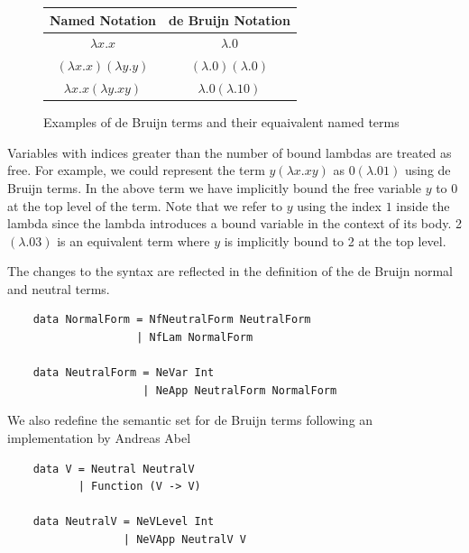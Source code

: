 \begin{figure}[h]
    \centering
    \begin{tabular}{ |c|c| } 
        \hline
        Named Notation & de Bruijn Notation \\
        \hline 
        $\lambda x.x$ & $\lambda . 0$ \\
        $(\lambda x. x)(\lambda y . y)$ & $(\lambda . 0)(\lambda . 0)$ \\
        $\lambda x. x (\lambda y. x y)$ & $\lambda . 0 (\lambda . 1 0 )$ \\
        \hline
    \end{tabular}
    \caption{Examples of de Bruijn terms and their equaivalent named terms}
    \label{fig:deBruijnExamples}
\end{figure}




Variables with indices greater than the number of bound lambdas are treated as free. For example, we could represent the term $y (\lambda x.xy)$ as $0 (\lambda .01)$ using de Bruijn terms. In the above term we have implicitly bound the free variable $y$ to 0 at the top level of the term. Note that we refer to $y$ using the index $1$ inside the lambda since the lambda introduces a bound variable in the context of its body. 2 $(\lambda . 0 3)$ is an equivalent term where $y$ is implicitly bound to 2 at the top level.

The changes to the syntax are reflected in the definition of the de Bruijn normal and neutral terms. 

\begin{lstlisting}
    data NormalForm = NfNeutralForm NeutralForm
                    | NfLam NormalForm

    data NeutralForm = NeVar Int
                     | NeApp NeutralForm NormalForm
\end{lstlisting}

We also redefine the semantic set for de Bruijn terms following an implementation by Andreas Abel \cite{deBruijn}

\begin{lstlisting}
    data V = Neutral NeutralV
           | Function (V -> V)

    data NeutralV = NeVLevel Int
                  | NeVApp NeutralV V
\end{lstlisting}

